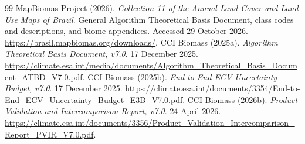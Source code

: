 \documentclass[11pt,a4paper]{article}
\begin{document}
\begin{thebibliography}{99}
 MapBiomas Project (2026). \emph{Collection 11 of the Annual Land Cover and Land Use Maps of Brazil}. General Algorithm Theoretical Basis Document, class codes and descriptions, and biome appendices. Accessed 29 October 2026. \url{https://brasil.mapbiomas.org/downloads/}.
 CCI Biomass (2025a). \emph{Algorithm Theoretical Basis Document, v7.0}. 17 December 2025. \url{https://climate.esa.int/media/documents/Algorithm_Theoretical_Basis_Document_ATBD_V7.0.pdf}.
 CCI Biomass (2025b). \emph{End to End ECV Uncertainty Budget, v7.0}. 17 December 2025. \url{https://climate.esa.int/documents/3354/End-to-End_ECV_Uncertainty_Budget_E3B_V7.0.pdf}.
 CCI Biomass (2026b). \emph{Product Validation and Intercomparison Report, v7.0}. 24 April 2026. \url{https://climate.esa.int/documents/3356/Product_Validation_Intercomparison_Report_PVIR_V7.0.pdf}.
\end{thebibliography}
\end{document}
